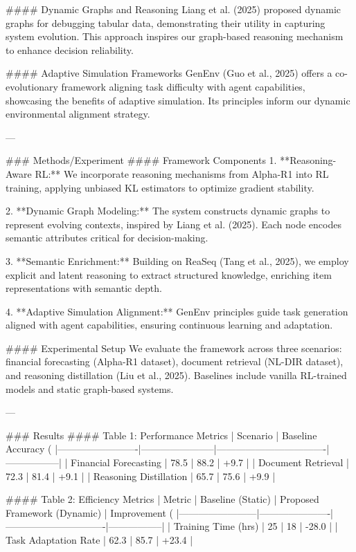 #### Dynamic Graphs and Reasoning  
Liang et al. (2025) proposed dynamic graphs for debugging tabular data, demonstrating their utility in capturing system evolution. This approach inspires our graph-based reasoning mechanism to enhance decision reliability.

#### Adaptive Simulation Frameworks  
GenEnv (Guo et al., 2025) offers a co-evolutionary framework aligning task difficulty with agent capabilities, showcasing the benefits of adaptive simulation. Its principles inform our dynamic environmental alignment strategy.

---

### Methods/Experiment  
#### Framework Components  
1. **Reasoning-Aware RL:**  
   We incorporate reasoning mechanisms from Alpha-R1 into RL training, applying unbiased KL estimators to optimize gradient stability.  

2. **Dynamic Graph Modeling:**  
   The system constructs dynamic graphs to represent evolving contexts, inspired by Liang et al. (2025). Each node encodes semantic attributes critical for decision-making.  

3. **Semantic Enrichment:**  
   Building on ReaSeq (Tang et al., 2025), we employ explicit and latent reasoning to extract structured knowledge, enriching item representations with semantic depth.

4. **Adaptive Simulation Alignment:**  
   GenEnv principles guide task generation aligned with agent capabilities, ensuring continuous learning and adaptation.  

#### Experimental Setup  
We evaluate the framework across three scenarios: financial forecasting (Alpha-R1 dataset), document retrieval (NL-DIR dataset), and reasoning distillation (Liu et al., 2025). Baselines include vanilla RL-trained models and static graph-based systems.

---

### Results  
#### Table 1: Performance Metrics  
| Scenario                | Baseline Accuracy (%
|-------------------------|-----------------------|----------------------------------|-----------------|  
| Financial Forecasting   | 78.5                 | 88.2                            | +9.7            |  
| Document Retrieval      | 72.3                 | 81.4                            | +9.1            |  
| Reasoning Distillation  | 65.7                 | 75.6                            | +9.9            |  

#### Table 2: Efficiency Metrics  
| Metric                 | Baseline (Static)    | Proposed Framework (Dynamic) | Improvement (%
|------------------------|----------------------|-------------------------------|-----------------|  
| Training Time (hrs)    | 25                  | 18                            | -28.0           |  
| Task Adaptation Rate   | 62.3                | 85.7                          | +23.4           |  

